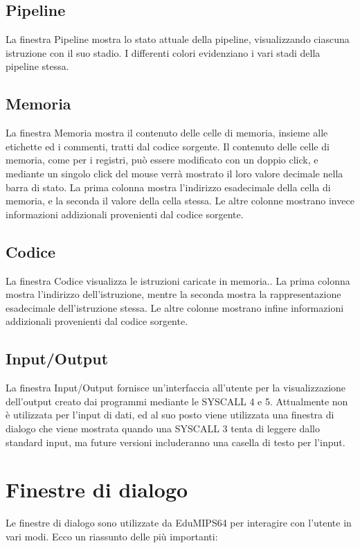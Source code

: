 \documentclass[letterpaper,10pt,italian]{sphinxmanual}
\begin{document}
\subsection{Pipeline}
\label{user-interface:pipeline}
La finestra Pipeline mostra lo stato attuale della pipeline, visualizzando
ciascuna istruzione con il suo stadio.  I differenti colori evidenziano i vari
stadi della pipeline stessa.


\subsection{Memoria}
\label{user-interface:memoria}
La finestra Memoria mostra il contenuto delle celle di memoria, insieme alle
etichette ed i commenti, tratti dal codice sorgente. Il contenuto delle celle
di memoria, come per i registri, può essere modificato con un doppio
click, e mediante un singolo click del mouse verrà mostrato il loro valore
decimale nella barra di stato.  La prima colonna mostra l'indirizzo
esadecimale della cella di memoria, e la seconda il valore della cella stessa.
Le altre colonne mostrano invece informazioni addizionali provenienti dal
codice sorgente.


\subsection{Codice}
\label{user-interface:codice}
La finestra Codice visualizza le istruzioni caricate in memoria.. La prima
colonna mostra l'indirizzo dell'istruzione, mentre la seconda mostra la
rappresentazione esadecimale dell'istruzione stessa. Le altre colonne mostrano
infine informazioni addizionali provenienti dal codice sorgente.


\subsection{Input/Output}
\label{user-interface:input-output}
La finestra Input/Output fornisce un'interfaccia all'utente per la
visualizzazione dell'output creato dai programmi mediante le SYSCALL 4 e 5.
Attualmente non è utilizzata per l'input di dati, ed al suo posto viene
utilizzata una finestra di dialogo che viene mostrata quando una SYSCALL 3
tenta di leggere dallo standard input, ma future versioni includeranno una
casella di testo per l'input.


\section{Finestre di dialogo}
\label{user-interface:finestre-di-dialogo}
Le finestre di dialogo sono utilizzate da EduMIPS64 per interagire con l'utente
in vari modi. Ecco un riassunto delle più importanti:
\end{document}
